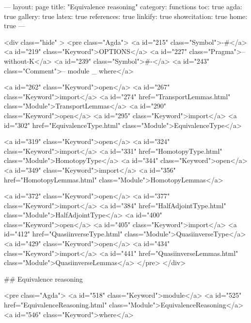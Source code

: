 ---
layout: page
title: "Equivalence reasoning"
category: functions
toc: true
agda: true
gallery: true
latex: true
references: true
linkify: true
showcitation: true
home: true
---

<div class="hide" >
<pre class="Agda">
<a id="215" class="Symbol">{-#</a> <a id="219" class="Keyword">OPTIONS</a> <a id="227" class="Pragma">--without-K</a> <a id="239" class="Symbol">#-}</a>
<a id="243" class="Comment">-- module _ where</a>

<a id="262" class="Keyword">open</a> <a id="267" class="Keyword">import</a> <a id="274" href="TransportLemmas.html" class="Module">TransportLemmas</a>
<a id="290" class="Keyword">open</a> <a id="295" class="Keyword">import</a> <a id="302" href="EquivalenceType.html" class="Module">EquivalenceType</a>

<a id="319" class="Keyword">open</a> <a id="324" class="Keyword">import</a> <a id="331" href="HomotopyType.html" class="Module">HomotopyType</a>
<a id="344" class="Keyword">open</a> <a id="349" class="Keyword">import</a> <a id="356" href="HomotopyLemmas.html" class="Module">HomotopyLemmas</a>

<a id="372" class="Keyword">open</a> <a id="377" class="Keyword">import</a> <a id="384" href="HalfAdjointType.html" class="Module">HalfAdjointType</a>
<a id="400" class="Keyword">open</a> <a id="405" class="Keyword">import</a> <a id="412" href="QuasiinverseType.html" class="Module">QuasiinverseType</a>
<a id="429" class="Keyword">open</a> <a id="434" class="Keyword">import</a> <a id="441" href="QuasiinverseLemmas.html" class="Module">QuasiinverseLemmas</a>
</pre>
</div>

## Equivalence reasoning

<pre class="Agda">
<a id="518" class="Keyword">module</a> <a id="525" href="EquivalenceReasoning.html" class="Module">EquivalenceReasoning</a> <a id="546" class="Keyword">where</a>

